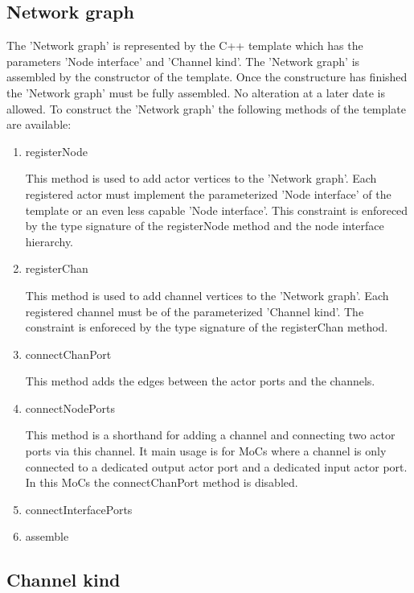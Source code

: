 \subsection{Network graph}
The 'Network graph' is represented by the C++ template
 which has the parameters 'Node interface'
and 'Channel kind'. The 'Network graph' is assembled by the
constructor of the   template.
Once the constructure has finished the 'Network graph' must
be fully assembled. No alteration at a later date is allowed.
To construct the 'Network graph' the following methods of the
 template are available:

\begin{enumerate}
\item registerNode

This method is used to add actor vertices to the 'Network graph'.
Each registered actor must implement
the parameterized 'Node interface' of the 
template or an even less capable 'Node interface'.
This constraint is enforeced by the type signature
of the registerNode method and the node interface hierarchy.

\item registerChan

This method is used to add channel vertices to the 'Network graph'.
Each registered channel must be of the parameterized 'Channel kind'.
The constraint is enforeced by the type signature
of the registerChan method.

\item connectChanPort

This method adds the edges between the actor ports and the
channels.

\item connectNodePorts

This method is a shorthand for adding a channel and
connecting two actor ports via this channel. It main usage
is for MoCs where a channel is only connected to a dedicated
output actor port and a dedicated input actor port. In
this MoCs the connectChanPort method is disabled.

\item connectInterfacePorts

\item assemble

\end{enumerate}




\subsection{Channel kind}

